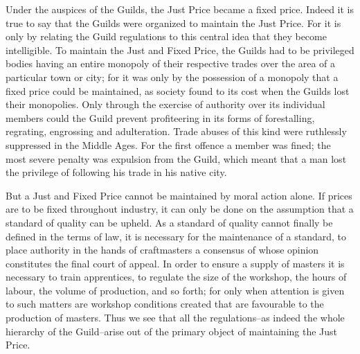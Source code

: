\documentclass{book}
\begin{document}
Under the auspices of the Guilds, the Just Price became a fixed price. Indeed it is true to say that the Guilds were organized to maintain the Just Price. For it is only by relating the Guild regulations to this central idea that they become intelligible. To maintain the Just and Fixed Price, the Guilds had to be privileged bodies having an entire monopoly of their respective trades over the area of a particular town or city; for it was only by the possession of a monopoly that a fixed price could be maintained, as society found to its cost when the Guilds lost their monopolies. Only through the exercise of authority over its individual members could the Guild prevent profiteering in its forms of forestalling, regrating, engrossing and adulteration. Trade abuses of this kind were ruthlessly suppressed in the Middle Ages. For the first offence a member was fined; the most severe penalty was expulsion from the Guild, which meant that a man lost the privilege of following his trade in his native city.

But a Just and Fixed Price cannot be maintained by moral action alone. If prices are to be fixed throughout industry, it can only be done on the assumption that a standard of quality can be upheld. As a standard of quality cannot finally be defined in the terms of law, it is necessary for the maintenance of a standard, to place authority in the hands of craftmasters a consensus of whose opinion constitutes the final court of appeal. In order to ensure a supply of masters it is necessary to train apprentices, to regulate the size of the workshop, the hours of labour, the volume of production, and so forth; for only when attention is given to such matters are workshop conditions created that are favourable to the production of masters. Thus we see that all the regulations–as indeed the whole hierarchy of the Guild–arise out of the primary object of maintaining the Just Price.
\end{document}
